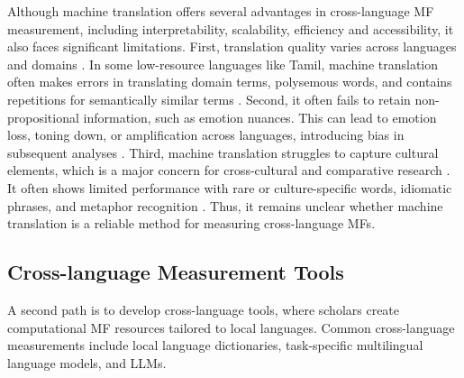 
Although machine translation offers several advantages in cross-language MF measurement, including interpretability, scalability, efficiency and accessibility, it also faces significant limitations. First, translation quality varies across languages and domains \citep{ranathunga2023neural}. In some low-resource languages like Tamil, machine translation often makes errors in translating domain terms, polysemous words, and contains repetitions for semantically similar terms \citep{ramesh2021comparing}. Second, it often fails to retain non-propositional information, such as emotion nuances. This can lead to emotion loss, toning down, or amplification across languages, introducing bias in subsequent analyses \citep{troiano2020lost}. Third, machine translation struggles to capture cultural elements, which is a major concern for cross-cultural and comparative research \citep{haidt2012righteous}. It often shows limited performance with rare or culture-specific words, idiomatic phrases, and metaphor recognition \citep{dorothy2019lost}. Thus, it remains unclear whether machine translation is a reliable method for measuring cross-language MFs. %

\subsection{Cross-language Measurement Tools}
A second path is to develop cross-language tools, where scholars create computational MF resources tailored to local languages. Common cross-language measurements include local language dictionaries, task-specific multilingual language models, and LLMs.

